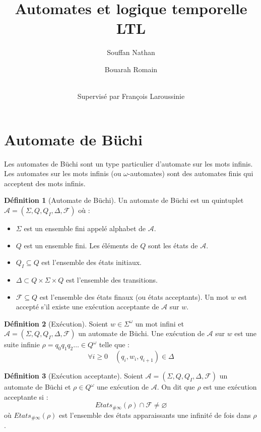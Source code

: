 \documentclass[12pt,a4paper]{article}
\title {Automates et logique temporelle LTL}
\author{
  Souffan Nathan \and
  Bouarah Romain \and
  \\Supervisé par François Laroussinie
}
\theoremstyle{plain}
\theoremstyle{definition}
\newtheorem{defi}{Définition}
\begin{document}
\maketitle
\tableofcontents

\section{Automate de Büchi}
Les automates de Büchi sont un type particulier d'automate sur les mots infinis.
Les automates sur les mots infinis (ou $\omega$-automates) sont des automates finis qui acceptent des mots infinis.

\begin{defi}[Automate de Büchi]
  Un automate de Büchi est un quintuplet $\mathcal{A}=(\Sigma, Q, Q_I, \Delta, \mathscr{F})$ où :
  \begin{itemize}
  \item $\Sigma$ est un ensemble fini appelé alphabet de $\mathcal{A}$.
  \item $Q$ est un ensemble fini. Les éléments de $Q$ sont les états de $\mathcal{A}$.
  \item $Q_I \subseteq Q$ est l'ensemble des états initiaux.
  \item $\Delta \subset Q \times \Sigma \times Q$ est l'ensemble des transitions.
  \item $\mathscr{F} \subseteq Q$ est l'ensemble des états finaux (ou états acceptants).
    Un mot $w$ est accepté s'il existe une exécution acceptante de $\mathcal{A}$ sur $w$.
  \end{itemize}
\end{defi}

\begin{defi}[Exécution]
  Soient $w \in \Sigma^\omega$ un mot infini et $\mathcal{A}=(\Sigma, Q, Q_I, \Delta, \mathscr{F})$ un automate de Büchi.
  Une exécution de $\mathcal{A}$ sur $w$ est une suite infinie $\rho = q_0q_1q_2\dots \in Q^\omega$ telle que :
  \[
    \forall i \geq 0 \quad (q_i, w_i, q_{i+1}) \in \Delta
  \]
\end{defi}

\begin{defi}[Exécution acceptante]
  \label{exec-accept}
  Soient $\mathcal{A}=(\Sigma, Q, Q_I, \Delta, \mathscr{F})$ un automate de Büchi et $\rho \in Q^\omega$ une exécution de $\mathcal{A}$.
  On dit que $\rho$ est une exécution acceptante si :
  \[
    Etats_{\#\infty}(\rho) \cap \mathscr{F} \neq \varnothing
  \]
  où $Etats_{\#\infty}(\rho)$ est l'ensemble des états apparaissants une infinité de fois dans $\rho$.
\end{defi}
\end{document}
